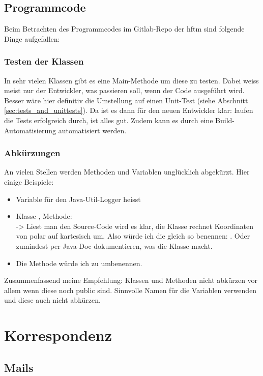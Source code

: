 \section{Programmcode}
Beim Betrachten des Programmcodes im Gitlab-Repo der \acrshort{hftm} sind folgende Dinge aufgefallen:
\subsection{Testen der Klassen}
In sehr vielen Klassen gibt es eine Main-Methode um diese zu testen. Dabei weiss meist nur der Entwickler, was passieren soll, wenn der Code ausgeführt wird. Besser wäre hier definitiv die Umstellung auf einen Unit-Test (siehe Abschnitt \ref{sec:tests_and_unittests}). Da ist es dann für den neuen Entwickler klar: laufen die Tests erfolgreich durch, ist alles gut. Zudem kann es durch eine Build-Automatisierung automatisiert werden.

\subsection{Abkürzungen}
An vielen Stellen werden Methoden und Variablen unglücklich abgekürzt. Hier einige Beispiele:
\begin{itemize}
	\item Variable für den Java-Util-Logger heisst 
	\item Klasse , Methode:  \\ -> Liest man den Source-Code wird es klar, die Klasse rechnet Koordinaten von polar auf kartesisch um. Also würde ich die gleich so benennen: . Oder zumindest per Java-Doc dokumentieren, was die Klasse macht.
	\item Die Methode  würde ich zu  umbenennen.
\end{itemize}
Zusammenfassend meine Empfehlung: Klassen und Methoden nicht abkürzen vor allem wenn diese noch public sind. Sinnvolle Namen für die Variablen verwenden und diese auch nicht abkürzen.

\chapter{Korrespondenz}
\section{Mails}
